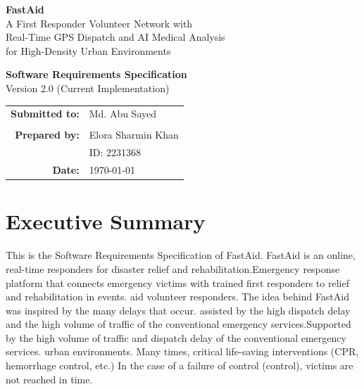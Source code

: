 \documentclass[12pt,a4paper]{article}
\begin{document}
\begin{titlepage}
\centering
\vspace*{1.5cm}

{\Huge\bfseries\textcolor{fastorange}{FastAid}}\\[0.5cm]
{\Large A First Responder Volunteer Network with\\
Real-Time GPS Dispatch and AI Medical Analysis\\
for High-Density Urban Environments}

\vspace{1.5cm}

{\large\textbf{Software Requirements Specification}}\\[0.3cm]
{\normalsize Version 2.0 (Current Implementation) }

\vspace{2cm}

\begin{tabular}{rl}
\textbf{Submitted to:} & Md. Abu Sayed \\
                         \\[0.8cm]
\textbf{Prepared by:}  & Elora Sharmin Khan \\
                        & ID: 2231368 \\[0.8cm]
\textbf{Date:}         & \today
\end{tabular}

\vfill

\end{titlepage}

\newpage
\tableofcontents
\newpage

\section{Executive Summary}

This is the Software Requirements Specification of FastAid. FastAid is an online, real-time responders for disaster relief and rehabilitation.Emergency response platform that connects emergency victims with trained first responders to relief and rehabilitation in events. aid volunteer responders. The idea behind FastAid was inspired by the many delays that occur. assisted by the high dispatch delay and the high volume of traffic of the conventional emergency services.Supported by the high volume of traffic and dispatch delay of the conventional emergency services. urban environments. Many times, critical life-saving interventions (CPR, hemorrhage control, etc.) In the case of a failure of control (control), victims are not reached in time.
\end{document}

